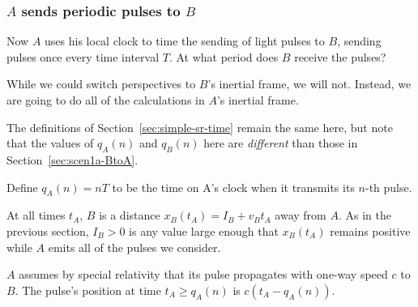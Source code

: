 \documentclass[a4paper]{article}
\theoremstyle{plain}
\theoremstyle{definition}
\begin{document}
\subsubsection{$A$ sends periodic pulses to $B$}
\label{sec:scen1a-AtoB}

Now $A$ uses his local clock to time the sending of light pulses to $B$,
sending pulses once every time interval $T$.
At what period does $B$ receive the pulses?

While we could switch perspectives to $B$'s inertial frame, we will
not.  Instead, we are going to do all of the calculations in $A$'s
inertial frame.

The definitions of Section~\ref{sec:simple-sr-time} remain the same here, but note
that the values of $q_A(n)$ and $q_B(n)$ here are {\em different} than
those in Section~\ref{sec:scen1a-BtoA}.

Define $q_A(n) = nT$ to be the time on A's clock when it transmits its
$n$-th pulse.

At all times $t_A$, $B$ is a distance $x_B(t_A) = I_B + v_B t_A$ away from $A$.
As in the previous section, $I_B > 0$ is any value large enough
that $x_B(t_A)$ remains positive while $A$ emits all of the pulses we consider.

$A$ assumes by special relativity that its pulse propagates with one-way
speed $c$ to $B$.  The pulse's position at time $t_A \geq q_A(n)$ is
$c(t_A - q_A(n))$.
\end{document}

